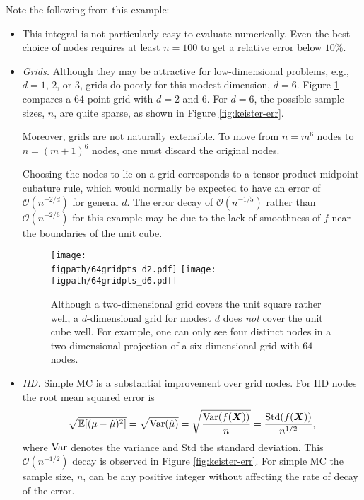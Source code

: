 \documentclass{svproc}
\newcommand{\figpath}{Figures}
\begin{document}
Note the following from this example:
\begin{itemize}
	\item This integral is not particularly easy to evaluate numerically.  Even the best choice of nodes requires at least $n=100$ to get a relative error below $10\%$.

	\item \emph{Grids.} Although they may be attractive for low-dimensional problems, e.g., $d = 1$, $2$, or $3$, grids do poorly for this modest dimension, $d=6$.  Figure \ref{fig:grid} compares a $64$ point grid with $d = 2$ and $6$.  For $d = 6$, the possible sample sizes, $n$, are quite sparse, as shown in Figure \ref{fig:keister-err}.

    Moreover, grids are not naturally extensible.  To move from $n = m^6$ nodes to $n = (m+1)^6$ nodes, one must discard the original nodes.

	Choosing the nodes to lie on a grid corresponds to a tensor product midpoint cubature rule, which would normally be expected to have an error of $\mathcal{O}(n^{-2/d})$  for general $d$.  The error decay of $\mathcal{O}(n^{-1/5})$ rather than $\mathcal{O}(n^{-2/6})$ for this example may be due to the lack of smoothness of $f$ near the boundaries of the unit cube.
\begin{figure}
	\centering
	\texttt{[image: \\figpath/64gridpts\_d2.pdf]}\qquad
	\texttt{[image: \\figpath/64gridpts\_d6.pdf]}
	\caption{Although a two-dimensional grid covers the unit square rather well, a $d$-dimensional grid for modest $d$ does \emph{not} cover the unit cube well.  For example, one can only see four distinct nodes in a two dimensional projection of a six-dimensional grid with $64$ nodes. \label{fig:grid}}
\end{figure}

	\item \emph{IID.}  Simple MC is a substantial improvement over grid nodes. For IID nodes the root mean squared error is
	\begin{equation}\label{eq:IIDerror}
		\sqrt{\mathbb{E}[(\mu - \hat{\mu})^2]} = \sqrt{\operatorname{Var}(\hat{\mu})} = \sqrt{\frac{\operatorname{Var}(f({\boldsymbol{X}}))}{n}} = \frac{\mathrm{Std}(f({\boldsymbol{X}}))}{n^{1/2}},
	\end{equation}
	where $\operatorname{Var}$ denotes the variance and $\mathrm{Std}$ the standard deviation.  This $\mathcal{O}(n^{-1/2})$ decay is observed in Figure \ref{fig:keister-err}. For simple MC the sample size, $n$, can be any positive integer without affecting the rate of decay of the error.


\end{itemize}
\end{document}
